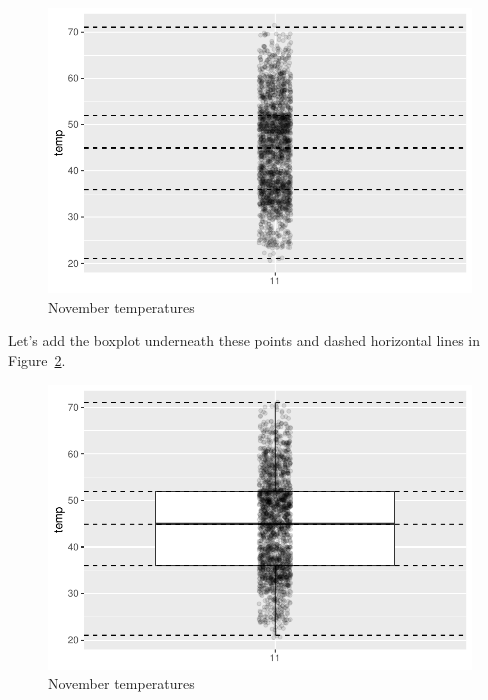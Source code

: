 \documentclass[
  letterpaper,
  DIV=11,
  numbers=noendperiod]{scrreprt}
\theoremstyle{definition}
\theoremstyle{remark}
\begin{document}
\begin{figure}

{\centering \includegraphics{02-visualization_files/figure-pdf/fig-nov2-1.pdf}

}

\caption{\label{fig-nov2}November temperatures}

\end{figure}

Let's add the boxplot underneath these points and dashed horizontal
lines in Figure~\ref{fig-nov3}.

\begin{figure}

{\centering \includegraphics{02-visualization_files/figure-pdf/fig-nov3-1.pdf}

}

\caption{\label{fig-nov3}November temperatures}

\end{figure}
\end{document}
